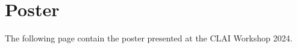 \chapter{Poster}
    \label{appendix:poster}
    The following page contain the poster presented at the CLAI Workshop 2024.
